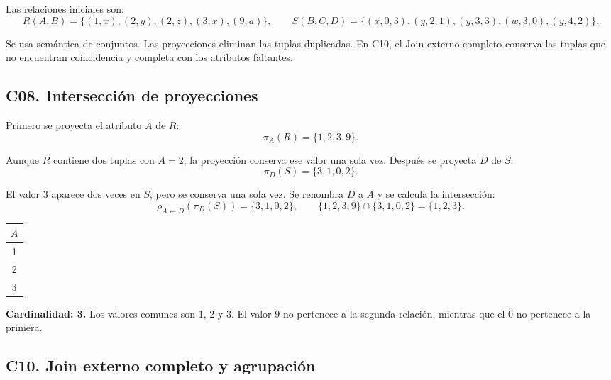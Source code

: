 

Las relaciones iniciales son:
\[
R(A,B)=\{(1,x),(2,y),(2,z),(3,x),(9,a)\},\qquad
S(B,C,D)=\{(x,0,3),(y,2,1),(y,3,3),(w,3,0),(y,4,2)\}.
\]

Se usa semántica de conjuntos. Las proyecciones eliminan las tuplas duplicadas. En C10, el Join externo completo conserva las tuplas que no encuentran coincidencia y completa con \nulo{} los atributos faltantes.

\subsection*{C08. Intersección de proyecciones}

Primero se proyecta el atributo $A$ de $R$:
\[
\pi_A(R)=\{1,2,3,9\}.
\]

Aunque $R$ contiene dos tuplas con $A=2$, la proyección conserva ese valor una sola vez. Después se proyecta $D$ de $S$:
\[
\pi_D(S)=\{3,1,0,2\}.
\]

El valor $3$ aparece dos veces en $S$, pero se conserva una sola vez. Se renombra $D$ a $A$ y se calcula la intersección:
\[
\rho_{A\leftarrow D}(\pi_D(S))=\{3,1,0,2\},\qquad
\{1,2,3,9\}\cap\{3,1,0,2\}=\{1,2,3\}.
\]

\begin{center}
\begin{tabular}{c}
\toprule
\rowcolor{Fondo}
$A$\\
\midrule
1\\
2\\
3\\
\bottomrule
\end{tabular}
\end{center}

\textbf{Cardinalidad: 3.} Los valores comunes son 1, 2 y 3. El valor 9 no pertenece a la segunda relación, mientras que el 0 no pertenece a la primera.

\subsection*{C10. Join externo completo y agrupación}

